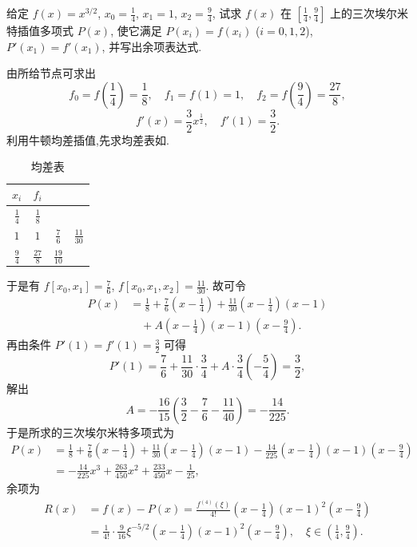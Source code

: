 \documentclass[../../main.tex]{subfiles}%
\begin{document}
\begin{example}
给定 $f(x) = x^{3/2}$, $x_0 = \frac{1}{4}$, $x_1 = 1$, $x_2 = \frac{9}{4}$, 试求 $f(x)$ 在 $\left[ \frac{1}{4}, \frac{9}{4} \right]$ 上的三次埃尔米特插值多项式 $P(x)$, 使它满足 $P(x_i) = f(x_i)$ ($i = 0, 1, 2$), $P'(x_1) = f'(x_1)$, 并写出余项表达式.
\end{example}
\begin{solution}
由所给节点可求出
\[
f_0 = f\left( \frac{1}{4} \right) = \frac{1}{8}, \quad f_1 = f(1) = 1, \quad f_2 = f\left( \frac{9}{4} \right) = \frac{27}{8},
\]
\[
f'(x) = \frac{3}{2} x^{\frac{1}{2}}, \quad f'(1) = \frac{3}{2}.
\]
利用牛顿均差插值,先求均差表如.
\begin{table}[H]
\centering
\caption{均差表}
\label{table:均差表111}
\begin{tabular}{c c c c}
\toprule
$x_i$ & $f_i$ &  &  \\
\midrule
$\frac{1}{4}$ & $\frac{1}{8}$ &  &  \\
$1$ & $1$ & $\frac{7}{6}$ & $\frac{11}{30}$ \\
$\frac{9}{4}$ & $\frac{27}{8}$ & $\frac{19}{10}$ &  \\
\bottomrule
\end{tabular}
\end{table}

于是有 $f[x_0, x_1] = \frac{7}{6}$, $f[x_0, x_1, x_2] = \frac{11}{30}$.
故可令
\begin{align*}
P(x) &= \frac{1}{8} + \frac{7}{6} \left( x - \frac{1}{4} \right) + \frac{11}{30} \left( x - \frac{1}{4} \right)(x - 1) \\
&\quad + A \left( x - \frac{1}{4} \right)(x - 1) \left( x - \frac{9}{4} \right).
\end{align*}
再由条件 $P'(1) = f'(1) = \frac{3}{2}$ 可得
\[
P'(1) = \frac{7}{6} + \frac{11}{30} \cdot \frac{3}{4} + A \cdot \frac{3}{4} \left( -\frac{5}{4} \right) = \frac{3}{2},
\]
解出
\[
A = -\frac{16}{15} \left( \frac{3}{2} - \frac{7}{6} - \frac{11}{40} \right) = -\frac{14}{225}.
\]
于是所求的三次埃尔米特多项式为
\begin{align*}
P(x) &= \frac{1}{8} + \frac{7}{6} \left( x - \frac{1}{4} \right) + \frac{11}{30} \left( x - \frac{1}{4} \right)(x - 1) - \frac{14}{225} \left( x - \frac{1}{4} \right)(x - 1) \left( x - \frac{9}{4} \right) \\
&= -\frac{14}{225} x^3 + \frac{263}{450} x^2 + \frac{233}{450} x - \frac{1}{25},
\end{align*}
余项为
\begin{align*}
R(x) &= f(x) - P(x) = \frac{f^{(4)}(\xi)}{4!} \left( x - \frac{1}{4} \right)(x - 1)^2 \left( x - \frac{9}{4} \right) \\
&= \frac{1}{4!} \cdot \frac{9}{16} \xi^{-5/2} \left( x - \frac{1}{4} \right)(x - 1)^2 \left( x - \frac{9}{4} \right), \quad \xi \in \left( \frac{1}{4}, \frac{9}{4} \right).
\end{align*}

\end{solution}
\end{document}
